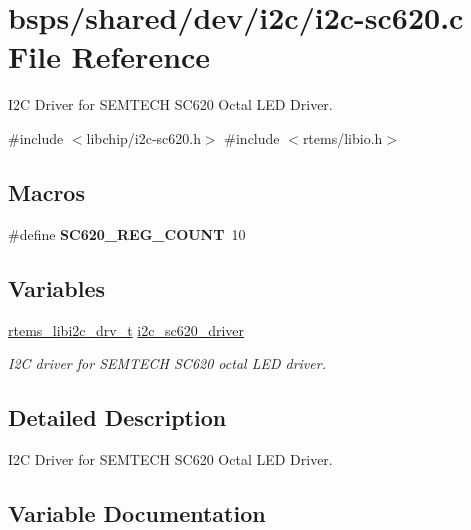 \hypertarget{i2c-sc620_8c}{}\section{bsps/shared/dev/i2c/i2c-\/sc620.c File Reference}
\label{i2c-sc620_8c}


I2C Driver for S\+E\+M\+T\+E\+CH S\+C620 Octal L\+ED Driver.  


{\ttfamily \#include $<$libchip/i2c-\/sc620.\+h$>$}\newline
{\ttfamily \#include $<$rtems/libio.\+h$>$}\newline
\subsection*{Macros}
\begin{DoxyCompactItemize}
\item 
\mbox{\label{i2c-sc620_8c_a620b0dacd761bf25b1583c929f72501b}} 
\#define {\bfseries S\+C620\+\_\+\+R\+E\+G\+\_\+\+C\+O\+U\+NT}~10
\end{DoxyCompactItemize}
\subsection*{Variables}
\begin{DoxyCompactItemize}
\item 
\mbox{\hyperlink{structrtems__libi2c__drv__t__}{rtems\+\_\+libi2c\+\_\+drv\+\_\+t}} \mbox{\hyperlink{i2c-sc620_8c_a4725afac999420a1b70134409f53a011}{i2c\+\_\+sc620\+\_\+driver}}
\begin{DoxyCompactList}\small\item\em I2C driver for S\+E\+M\+T\+E\+CH S\+C620 octal L\+ED driver. \end{DoxyCompactList}\end{DoxyCompactItemize}


\subsection{Detailed Description}
I2C Driver for S\+E\+M\+T\+E\+CH S\+C620 Octal L\+ED Driver. 



\subsection{Variable Documentation}
\mbox{\label{i2c-sc620_8c_a4725afac999420a1b70134409f53a011}} 

